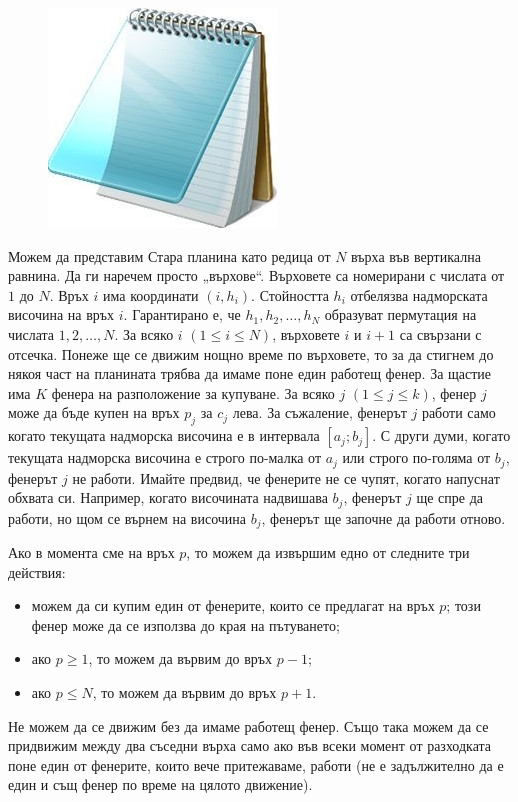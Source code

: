 \documentclass[12pt]{article}
\begin{document}
\newcommand{\tl}{$3$ сек.}
\newcommand{\ml}{$256$ MB}

\begin{figure}
	\begin{adjustbox}{width=0.25\textwidth}
		\includegraphics{image}
	\end{adjustbox}
\end{figure}
Можем да представим Стара планина като редица от $N$ върха във вертикална равнина. Да ги наречем просто „върхове“. Върховете са номерирани с числата от $1$ до $N$. Връх $i$ има координати $(i, h_i)$. Стойността $h_i$ отбелязва надморската височина на връх $i$. Гарантирано е, че $h_1, h_2, \dots, h_ N$ образуват пермутация на числата $1, 2, \dots,  N$. За всяко $i$ $(1 \le i \le  N)$, върховете $i$ и $i+1$ са свързани с отсечка. Понеже ще се движим нощно време по върховете, то за да стигнем до някоя част на планината трябва да имаме поне един работещ фенер. За щастие има $K$ фенера на разположение за купуване. За всяко $j$ $(1 \le j \le k)$, фенер $j$ може да бъде купен на връх $p_j$ за $c_j$ лева. За съжаление, фенерът $j$ работи само когато текущата надморска височина е в интервала $[a_j; b_j]$. С други думи, когато текущата надморска височина е строго по-малка от $a_j$ или строго по-голяма от $b_j$, фенерът $j$ не работи. Имайте предвид, че фенерите не се чупят, когато напуснат обхвата си. Например, когато височината надвишава $b_j$, фенерът $j$ ще спре да работи, но щом се върнем на височина $b_j$, фенерът ще започне да работи отново.

Ако в момента сме на връх $p$, то можем да извършим едно от следните три действия:
\begin{itemize}
	\item можем да си купим един от фенерите, които се предлагат на връх $p$; този фенер може да се използва до края на пътуването;
	\item ако $p \ge 1$, то можем да вървим до връх $p-1$;
	\item ако $p \le  N$, то можем да вървим до връх $p+1$.
\end{itemize}
Не можем да се движим без да имаме работещ фенер. Също така можем да се придвижим между два съседни върха само ако във всеки момент от разходката поне един от фенерите, които вече притежаваме, работи (не е задължително да е един и същ фенер по време на цялото движение).
\end{document}
